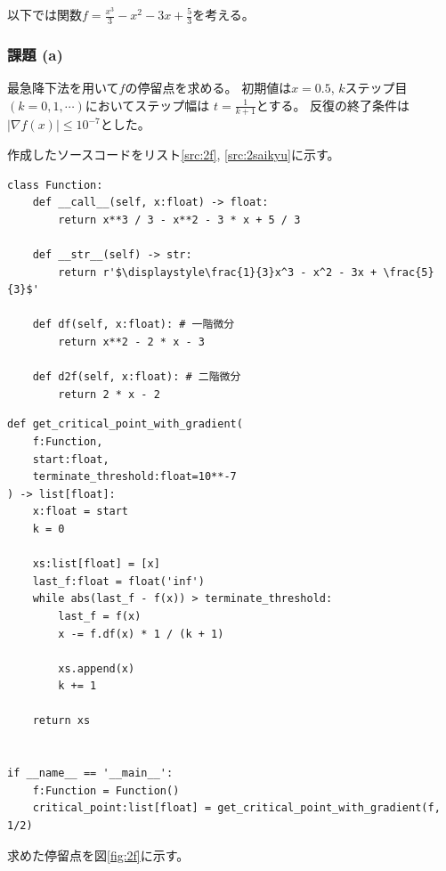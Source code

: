 \documentclass[a4j, titlepage]{jsarticle}
\numberwithin{equation}{section}
\begin{document}
        以下では関数$f=\displaystyle\frac{x^3}{3}-x^2-3x+\frac{5}{3}$を考える。

        \subsubsection{課題 (a)} \label{sec:2a}
            最急降下法を用いて$f$の停留点を求める。
            初期値は$x=0.5$, $k$ステップ目$(k=0,1,\cdots)$においてステップ幅は
            $\displaystyle t=\frac{1}{k+1}$とする。
            反復の終了条件は$|\nabla f(x)| \leq 10^{-7}$とした。

            作成したソースコードをリスト\ref{src:2f}, \ref{src:2saikyu}に示す。

            \begin{lstlisting}[caption=$f$の実装, label=src:2f]
class Function:
    def __call__(self, x:float) -> float:
        return x**3 / 3 - x**2 - 3 * x + 5 / 3
    
    def __str__(self) -> str:
        return r'$\displaystyle\frac{1}{3}x^3 - x^2 - 3x + \frac{5}{3}$'
    
    def df(self, x:float): # 一階微分
        return x**2 - 2 * x - 3
    
    def d2f(self, x:float): # 二階微分
        return 2 * x - 2
            \end{lstlisting}

            \begin{lstlisting}[caption=最急降下法の実装, label=src:2saikyu]
def get_critical_point_with_gradient(
    f:Function,
    start:float,
    terminate_threshold:float=10**-7
) -> list[float]:
    x:float = start
    k = 0
    
    xs:list[float] = [x]
    last_f:float = float('inf')
    while abs(last_f - f(x)) > terminate_threshold:
        last_f = f(x)
        x -= f.df(x) * 1 / (k + 1)
        
        xs.append(x)
        k += 1
    
    return xs


if __name__ == '__main__':
    f:Function = Function()
    critical_point:list[float] = get_critical_point_with_gradient(f, 1/2)
            \end{lstlisting}

            求めた停留点を図\ref{fig:2f}に示す。
\end{document}
